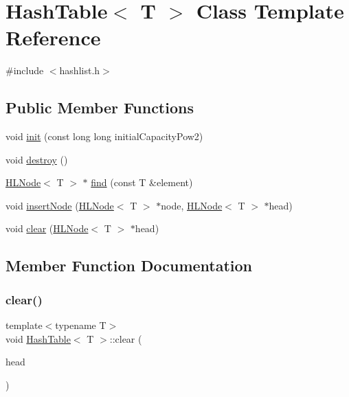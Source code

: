\hypertarget{classHashTable}{}\section{Hash\+Table$<$ T $>$ Class Template Reference}
\label{classHashTable}


{\ttfamily \#include $<$hashlist.\+h$>$}

\subsection*{Public Member Functions}
\begin{DoxyCompactItemize}
\item 
void \hyperlink{classHashTable_a1c4b10294609ef8f7d826769841c2da4}{init} (const long long initial\+Capacity\+Pow2)
\item 
void \hyperlink{classHashTable_aa296056d4ceede53c73ca0b6221aa5e2}{destroy} ()
\item 
\hyperlink{classHLNode}{H\+L\+Node}$<$ T $>$ $\ast$ \hyperlink{classHashTable_a33acb23f2c3b2111811f4ba068cf585e}{find} (const T \&element)
\item 
void \hyperlink{classHashTable_a6305be5a3ca8a048a64b32e6dc5067f3}{insert\+Node} (\hyperlink{classHLNode}{H\+L\+Node}$<$ T $>$ $\ast$node, \hyperlink{classHLNode}{H\+L\+Node}$<$ T $>$ $\ast$head)
\item 
void \hyperlink{classHashTable_a1910ddcff318a8d92d9b8df2e55534ff}{clear} (\hyperlink{classHLNode}{H\+L\+Node}$<$ T $>$ $\ast$head)
\end{DoxyCompactItemize}


\subsection{Member Function Documentation}
\mbox{\label{classHashTable_a1910ddcff318a8d92d9b8df2e55534ff}} 
\subsubsection{\texorpdfstring{clear()}{clear()}}
{\footnotesize\ttfamily template$<$typename T$>$ \\
void \hyperlink{classHashTable}{Hash\+Table}$<$ T $>$\+::clear (\begin{DoxyParamCaption}\item[{\hyperlink{classHLNode}{H\+L\+Node}$<$ T $>$ $\ast$}]{head }\end{DoxyParamCaption})\hspace{0.3cm}{\ttfamily [inline]}}


